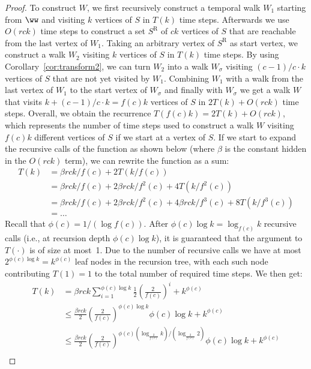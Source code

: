 {\begin{proof}
    To construct $W$, we first recursively construct a temporal walk $W_{1}$
    starting from $\ww$ and visiting $k$ vertices of $S$ in $T(k)$ time steps.
    Afterwards we use $O(rck)$ time steps to construct a set $S^{\mathrm{R}}$ of
    $ck$ vertices of $S$ that are reachable from the last vertex of
    $W_{1}$. Taking an arbitrary vertex of $S^{\mathrm{R}}$ as start
    vertex, we construct a walk {$W_{2}$} visiting $k$ vertices
    of $S$ in $T(k)$ time steps. By using Corollary~\ref{cor:transform2},
    we can turn {$W_{2}$} into a walk {$W_{\sigma}$} visiting
    $(c-1)/c \cdot k$ vertices of $S$ that are not yet visited by
    $W_{1}$. Combining $W_{1}$ with a walk from the last
    vertex of $W_{1}$ to the start vertex of
    {$W_{\sigma}$} and {finally} with {$W_{\sigma}$} we get a walk
    $W$ that visits $k+(c-1)/c \cdot k=f(c)k$ vertices of $S$ in $2T(k)+O(rck)$
    time steps. Overall, we obtain the recurrence $T(f(c)k)
    = 2T(k)+O(rck)$, which represents the number of time steps used to construct a
    walk $W$ visiting $f(c)k$ different vertices of $S$ if we start at a vertex
    of $S$. If we start to expand the recursive calls of the function as shown
    below (where $\beta$ is the constant hidden in the $O(rck)$ term), we can
    rewrite the function as a sum:
    \begin{align*} 
        T(k)    &= \beta rck/f(c) + 2T(k/f(c))\\ 
                &=  \beta rck/f(c) + 2\beta rck/f^2(c) + 4T(k/f^2(c))\\ 
                &=  \beta rck/f(c) + 2\beta rck/f^2(c) + 4\beta rck/f^3(c) + 8T(k/f^3(c))\\ 
                &= \ldots
    \end{align*}
    Recall that $\phi(c)=1/(\log {f(c)})$. After $\phi(c) \log k=\log_{f(c)} k$ recursive
    calls (i.e., at recursion depth $\phi(c)\log k$), it is guaranteed that the argument to $T(\cdot)$ is of size at
    most~1. Due to the number of recursive calls we have at most $2^{\phi(c)\log k}=
    k^{\phi(c)}$
    leaf nodes in the recursion tree, with each such node contributing $T(1)=1$
    to the total number of required time steps. We then get:
    \begin{align*} 
        T(k)    &= \beta rck \sum_{i=1}^{\phi(c)\log k} \frac{1}{2}(\frac{2}{f(c)})^{i} + k^{\phi(c)}\\ 
                &\leq \frac{\beta rck}{2} (\frac{2}{f(c)})^{\phi(c) \log k}\phi(c)\log k + k^{\phi(c)}\\ 
                &\leq \frac{\beta rck}{2} (\frac{2}{f(c)})^{\phi(c) (\log_{\frac{2}{f(c)}} k) / (\log_{\frac{2}{f(c)}} 2)}\phi(c)\log k + k^{\phi(c)}\\ 

\end{align*}
\end{proof}}
